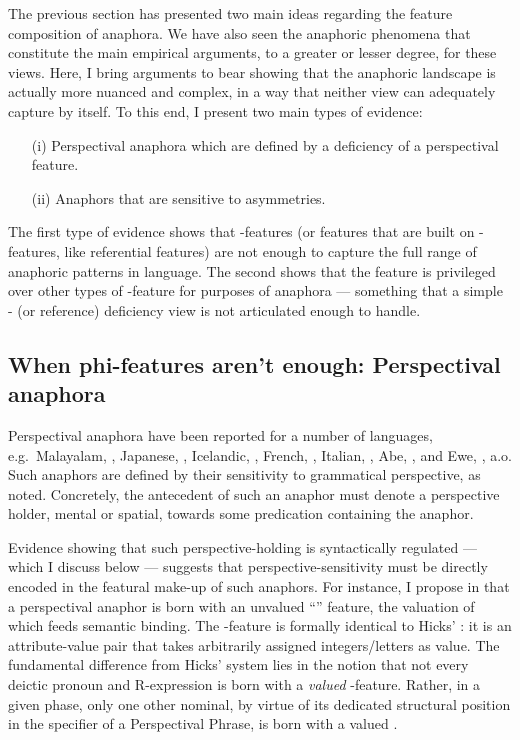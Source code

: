\documentclass[output=paper, modfonts, nonflat]{langsci/langscibook}
\begin{document}
The previous section has presented two main ideas regarding the
feature composition of anaphora. We have also seen the anaphoric
phenomena that constitute the main empirical arguments, to a greater
or lesser degree, for these views. Here, I bring arguments to bear
showing that the anaphoric landscape is actually more nuanced and
complex, in a way that neither view can adequately capture by
itself. To this end, I present two main types of evidence:
\begin{itemize}
\item[(i)] Perspectival anaphora which are defined by a deficiency of
  a perspectival feature.
  \item[(ii)] Anaphors that are sensitive to \person{} asymmetries. 
  \end{itemize}
  The first type of evidence shows that \ph-features (or features that
  are built on \ph-features, like referential features) are not enough
  to capture the full range of anaphoric patterns in language. The
  second shows that the \person{} feature is privileged over other
  types of \ph-feature for purposes of anaphora --- something that a
  simple \ph- (or reference) deficiency view is not articulated enough
  to handle. 
  

 \subsection{When phi-features aren't enough: Perspectival anaphora}

 Perspectival anaphora have been reported for a number of languages, e.g.\ Malayalam, \citep{jayaseelan:1997}, Japanese,
 \citep{kuno:1987, nishigauchi:2014}, Icelandic,
 \citep{hellan:1988, sigurdsson:1991}, French,
 \citep{charnavel:2016}, Italian, \citep{giorgi:2010}, Abe,
 \citep{koopmansportiche:1989}, and Ewe, \citep{pearson:2013},
 a.o. Such anaphors are defined by their sensitivity to grammatical
 perspective, as noted. Concretely, the antecedent of such an anaphor
 must denote a perspective holder, mental or spatial, towards some
 predication containing the anaphor.

 Evidence showing that such perspective-holding is syntactically
 regulated --- which I discuss below --- suggests that
 perspective-sensitivity must be directly encoded in the featural
 make-up of such anaphors.  For instance, I propose in
 \citet{sundaresan:2012, sundaresan:2018} that a perspectival anaphor
 is born with an unvalued ``\dep'' feature, the valuation of which
 feeds semantic binding. The \dep-feature is formally identical to
 Hicks' \var: it is an attribute-value pair that takes arbitrarily
 assigned integers/letters as value.  The fundamental difference from
 Hicks' system lies in the notion that not every deictic pronoun and
 R-expression is born with a \emph{valued} \dep-feature. Rather, in a
 given phase, only one other nominal, by virtue of its dedicated
 structural position in the specifier of a Perspectival Phrase, is
 born with a valued \dep.
\end{document}
